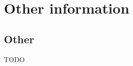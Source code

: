 \documentclass[letterpaper]{twentysecondcv} %
\begin{document}

\section{Other information}

\subsection{Other}

TODO








\end{document}
